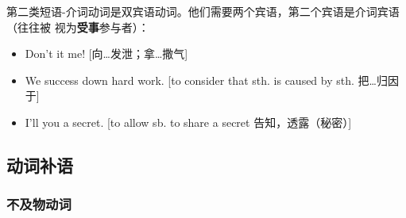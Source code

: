 第二类短语-介词动词是双宾语动词。他们需要两个宾语，第二个宾语是介词宾语（往往被
视为\textbf{受事}参与者）：
\begin{itemize}
\item Don't  it  me! [向…发泄；拿…撒气]

\item We  success down  hard work. [to consider that sth.
is caused by sth. 把…归因于]

\item I'll  you  a secret. [to allow sb. to share a secret
告知，透露（秘密）]
\end{itemize}

\subsection{动词补语}

\subsubsection{不及物动词}

